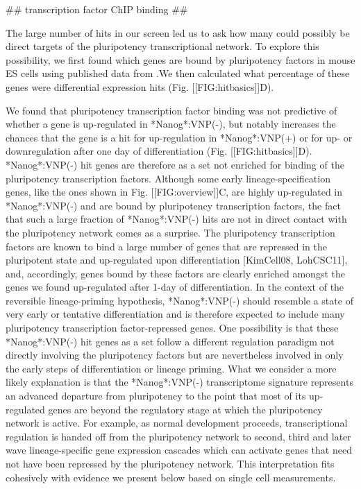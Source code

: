 \documentclass[aps,prl,twocolumn,superscriptaddress]{revtex4}
\begin{document}
## transcription factor ChIP binding  ##

The large number of hits in our screen led us to ask how many could possibly be direct targets of the pluripotency transcriptional network. To explore this possibility, we first found which genes are bound by pluripotency factors in mouse ES cells using published data from \citet{KimCell08}.We then calculated what percentage of these genes were differential expression hits (Fig. [[FIG:hitbasics]]D).

We found that pluripotency transcription factor binding was not predictive of whether a gene is up-regulated in *Nanog*:VNP(-), but notably increases the chances that the gene is a hit for up-regulation in *Nanog*:VNP(+) or for up- or downregulation after one day of differentiation (Fig. [[FIG:hitbasics]]D). *Nanog*:VNP(-) hit genes are therefore as a set not enriched for binding of the pluripotency transcription factors. Although some early lineage-specification genes, like the ones shown in Fig. [[FIG:overview]]C, are highly up-regulated in *Nanog*:VNP(-) and are bound by pluripotency transcription factors, the fact that such a large fraction of *Nanog*:VNP(-) hits are not in direct contact with the pluripotency network comes as a surprise.  
The pluripotency transcription factors are known to bind a large number of genes that are repressed in the pluripotent state and up-regulated upon differentiation [KimCell08, LohCSC11], and, accordingly, genes bound by these factors are clearly enriched amongst the genes we found up-regulated after 1-day of differentiation. In the context of the reversible lineage-priming hypothesis, *Nanog*:VNP(-) should resemble a state of very early or tentative differentiation and is therefore expected to include many pluripotency transcription factor-repressed genes. One possibility is that these *Nanog*:VNP(-) hit genes as a set follow a different regulation paradigm not directly involving the pluripotency factors but are nevertheless involved in only the early steps of differentiation or lineage priming. What we consider a more likely explanation is that the *Nanog*:VNP(-) transcriptome signature represents an advanced departure from pluripotency to the point that most of its up-regulated genes are beyond the regulatory stage at which the pluripotency network is active. For example, as normal development proceeds, transcriptional regulation is handed off from the pluripotency network to second, third and later wave lineage-specific gene expression cascades which can activate genes that need not have been repressed by the pluripotency network. This interpretation fits cohesively with evidence we present below based on single cell measurements.
\end{document}
